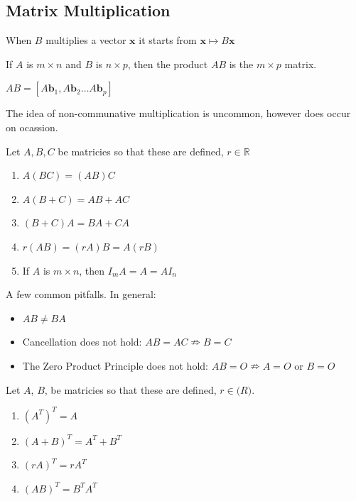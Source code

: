 \documentclass{report}
\begin{document}
\subsection*{Matrix Multiplication}
When $B$ multiplies a vector $\mathbf{x}$ it starts from $\mathbf{x}\mapsto B\mathbf{x}$

\begin{definition}
If $A$ is $m \times n$ and $B$ is $n \times p$, then the product $AB$ is the $m \times p$ matrix.
\begin{center}
$AB = [A\mathbf{b}_1, A\mathbf{b}_2 \dots A\mathbf{b}_p]$
\end{center}
\end{definition}

\begin{remark}
The idea of non-communative multiplication is uncommon, however does occur on ocassion.
\end{remark}

\begin{example}
Let $A, B, C$ be matricies so that these are defined, $r \in \mathbb{R}$
\begin{enumerate}
	\item $A(BC) = (AB)C$
	\item $A(B + C) = AB + AC$
	\item $(B + C)A = BA + CA$
	\item $r(AB) = (rA)B = A(rB)$
	\item If $A$ is $m \times n$, then $I_mA = A = AI_n$
\end{enumerate}
\end{example}
\noindent A few common pitfalls. In general:
\begin{itemize}
	\item $AB \neq BA$
	\item Cancellation does not hold: $AB = AC \nRightarrow B = C$
	\item The Zero Product Principle does not hold: $AB = O \nRightarrow A = O$ or $B = O$
\end{itemize}
\begin{example}
Let $A$, $B$, be matricies so that these are defined, $r \in \mathbb(R)$.
\begin{enumerate}
	\item $(A^T)^T = A$
	\item $(A + B)^T = A^T + B^T$
	\item $(rA)^T = rA^T$
	\item $(AB)^T = B^TA^T$
\end{enumerate}
\end{example}
\end{document}
